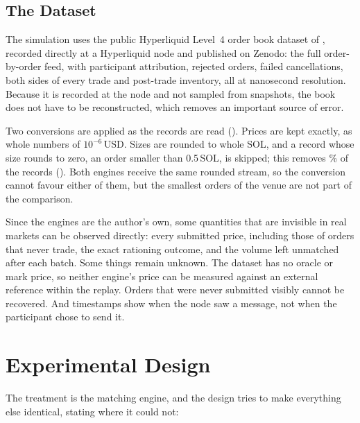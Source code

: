 \subsection{The Dataset}
\label{sec:dataset}

The simulation uses the public Hyperliquid Level~4 order book dataset of
\citet{albers2026openbook}, recorded directly at a Hyperliquid node and
published on Zenodo: the full order-by-order feed, with participant
attribution, rejected orders, failed cancellations, both sides of every
trade and post-trade inventory, all at nanosecond resolution. Because it is
recorded at the node and not sampled from snapshots, the book does not have
to be reconstructed, which removes an important source of error.

Two conversions are applied as the records are read
(). Prices are kept exactly, as whole numbers of
$10^{-6}$\,USD. Sizes are rounded to whole SOL, and a record whose size
rounds to zero, an order smaller than 0.5\,SOL, is skipped; this removes
\SampleSkippedPct\% of the records (). Both engines receive
the same rounded stream, so the conversion cannot favour either of them, but
the smallest orders of the venue are not part of the comparison.

Since the engines are the author's own, some quantities that are invisible in
real markets can be observed directly: every submitted price, including those
of orders that never trade, the exact rationing outcome, and the volume left
unmatched after each batch. Some things remain unknown. The dataset has no
oracle or mark price, so neither engine's price can be measured against an
external reference within the replay.
Orders that were never submitted visibly cannot be recovered. And timestamps
show when the node saw a message, not when the participant chose to send it.

\section{Experimental Design}
\label{sec:experiments}

The treatment is the matching engine, and the design tries to make everything
else identical, stating where it could not:

